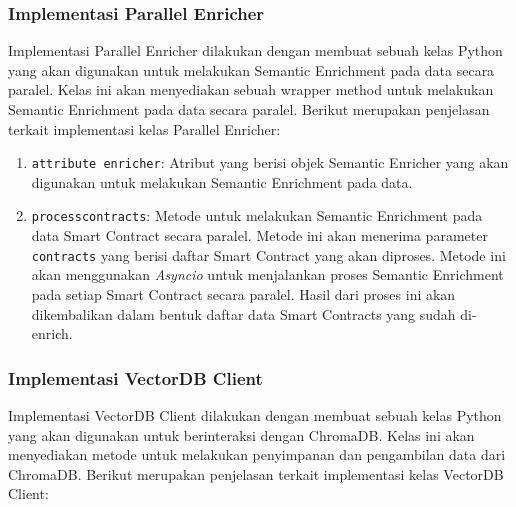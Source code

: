 \subsubsection{Implementasi Parallel Enricher}

Implementasi Parallel Enricher dilakukan dengan membuat sebuah kelas Python yang akan digunakan untuk melakukan Semantic Enrichment pada data secara paralel. Kelas ini akan menyediakan sebuah wrapper method untuk melakukan Semantic Enrichment pada data secara paralel. Berikut merupakan penjelasan terkait implementasi kelas Parallel Enricher:

\begin{enumerate}
    \item \texttt{attribute enricher}: Atribut yang berisi objek Semantic Enricher yang akan digunakan untuk melakukan Semantic Enrichment pada data.
    \item \texttt{process\textunderscore contracts}: Metode untuk melakukan Semantic Enrichment pada data Smart Contract secara paralel. Metode ini akan menerima parameter \texttt{contracts} yang berisi daftar Smart Contract yang akan diproses. Metode ini akan menggunakan \textit{Asyncio} untuk menjalankan proses Semantic Enrichment pada setiap Smart Contract secara paralel. Hasil dari proses ini akan dikembalikan dalam bentuk daftar data Smart Contracts yang sudah di-enrich.
\end{enumerate}

\subsubsection{Implementasi VectorDB Client}

Implementasi VectorDB Client dilakukan dengan membuat sebuah kelas Python yang akan digunakan untuk berinteraksi dengan ChromaDB. Kelas ini akan menyediakan metode untuk melakukan penyimpanan dan pengambilan data dari ChromaDB. Berikut merupakan penjelasan terkait implementasi kelas VectorDB Client:

